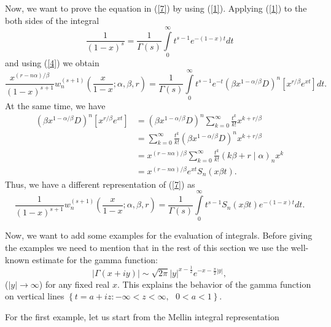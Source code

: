 \documentclass{article}%
\begin{document}
Now, we want to prove the equation in (\ref{7}) by using (\ref{1}). Applying
(\ref{1}) to the both sides of the integral%
\[
\frac{1}{\left(  1-x\right)  ^{s}}=\frac{1}{\Gamma\left(  s\right)  }%
{\displaystyle\int\limits_{0}^{\infty}}
t^{s-1}e^{-\left(  1-x\right)  t}dt
\]
and using (\ref{4}) we obtain%
\[
\frac{x^{\left(  r-n\alpha\right)  /\beta}}{\left(  1-x\right)  ^{s+1}}%
w_{n}^{\left(  s+1\right)  }\left(  \frac{x}{1-x};\alpha,\beta,r\right)
=\frac{1}{\Gamma\left(  s\right)  }%
{\displaystyle\int\limits_{0}^{\infty}}
t^{s-1}e^{-t}\left(  \beta x^{1-\alpha/\beta}D\right)  ^{n}\left[  x^{r/\beta
}e^{xt}\right]  dt.
\]
At the same time, we have%
\begin{align*}
\left(  \beta x^{1-\alpha/\beta}D\right)  ^{n}\left[  x^{r/\beta}%
e^{xt}\right]   &  =\left(  \beta x^{1-\alpha/\beta}D\right)  ^{n}\sum
_{k=0}^{\infty}\frac{t^{k}}{k!}x^{k+r/\beta}\\
&  =\sum_{k=0}^{\infty}\frac{t^{k}}{k!}\left(  \beta x^{1-\alpha/\beta
}D\right)  ^{n}x^{k+r/\beta}\\
&  =x^{\left(  r-n\alpha\right)  /\beta}\sum_{k=0}^{\infty}\frac{t^{k}}%
{k!}\left(  k\beta+r\mid\alpha\right)  _{n}x^{k}\\
&  =x^{\left(  r-n\alpha\right)  /\beta}e^{xt}S_{n}\left(  x\beta t\right)  .
\end{align*}
Thus, we have a different representation of (\ref{7}) as%
\[
\frac{1}{\left(  1-x\right)  ^{s+1}}w_{n}^{\left(  s+1\right)  }\left(
\frac{x}{1-x};\alpha,\beta,r\right)  =\frac{1}{\Gamma\left(  s\right)  }%
{\displaystyle\int\limits_{0}^{\infty}}
t^{s-1}S_{n}\left(  x\beta t\right)  e^{-\left(  1-x\right)  t}dt.
\]


Now, we want to add some examples for the evaluation of integrals. Before
giving the examples we need to mention that in the rest of this section we use
the well-known estimate for the gamma function:%
\[
\left\vert \Gamma\left(  x+iy\right)  \right\vert \sim\sqrt{2\pi}\left\vert
y\right\vert ^{x-\frac{1}{2}}e^{-x-\frac{\pi}{2}\left\vert y\right\vert },
\]
($\left\vert y\right\vert \rightarrow\infty$) for any fixed real $x.$ This
explains the behavior of the gamma function on vertical lines $\left\{
t=a+iz:-\infty<z<\infty,\text{ }0<a<1\right\}  $.

For the first example, let us start from the Mellin integral representation
\cite[Formula 5.37]{Oberhettinger}%
\end{document}
